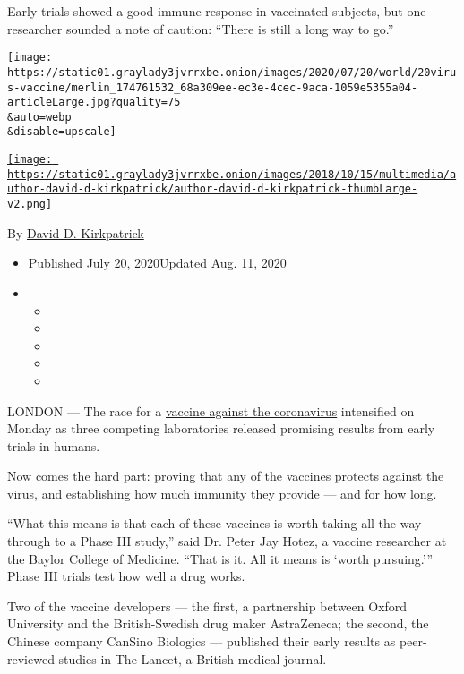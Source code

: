 Early trials showed a good immune response in vaccinated subjects, but
one researcher sounded a note of caution: ``There is still a long way to
go.''

\texttt{[image: https://static01.graylady3jvrrxbe.onion/images/2020/07/20/world/20virus-vaccine/merlin\_174761532\_68a309ee-ec3e-4cec-9aca-1059e5355a04-articleLarge.jpg?quality=75\\\&auto=webp\\\&disable=upscale]}

\href{https://www.nytimes3xbfgragh.onion/by/david-d-kirkpatrick}{\texttt{[image: https://static01.graylady3jvrrxbe.onion/images/2018/10/15/multimedia/author-david-d-kirkpatrick/author-david-d-kirkpatrick-thumbLarge-v2.png]}}

By
\href{https://www.nytimes3xbfgragh.onion/by/david-d-kirkpatrick}{David
D. Kirkpatrick}

\begin{itemize}
\item
  Published July 20, 2020Updated Aug. 11, 2020
\item
  \begin{itemize}
  \item
  \item
  \item
  \item
  \item
  \end{itemize}
\end{itemize}

LONDON --- The race for a
\href{https://www.nytimes3xbfgragh.onion/2020/08/05/health/volunteer-coronavirus-vaccine-trial.html}{vaccine
against the coronavirus} intensified on Monday as three competing
laboratories released promising results from early trials in humans.

Now comes the hard part: proving that any of the vaccines protects
against the virus, and establishing how much immunity they provide ---
and for how long.

``What this means is that each of these vaccines is worth taking all the
way through to a Phase III study,'' said Dr. Peter Jay Hotez, a vaccine
researcher at the Baylor College of Medicine. ``That is it. All it means
is `worth pursuing.''' Phase III trials test how well a drug works.

Two of the vaccine developers --- the first, a partnership between
Oxford University and the British-Swedish drug maker AstraZeneca; the
second, the Chinese company CanSino Biologics --- published their early
results as peer-reviewed studies in The Lancet, a British medical
journal.

